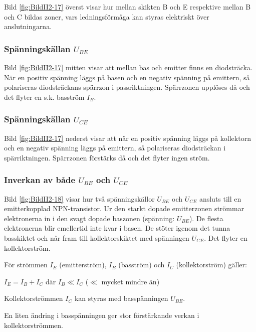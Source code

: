 Bild \ref{fig:BildII2-17} överst visar hur mellan skikten B och E respektive
mellan B och C bildas zoner, vars ledningsförmåga kan styras elektriskt över
anslutningarna.

\subsubsection{Spänningskällan \(U_{BE}\)}

Bild \ref{fig:BildII2-17} mitten visar att mellan bas och emitter finns en
diodsträcka.
När en positiv spänning läggs på basen och en negativ spänning på emittern,
så polariseras diodsträckans spärrzon i passriktningen.
Spärrzonen upplöses då och det flyter en s.k. basström \(I_B\).

\subsubsection{Spänningskällan \(U_{CE}\)}

Bild \ref{fig:BildII2-17} nederst visar att när en positiv spänning läggs
på kollektorn och en negativ spänning läggs på emittern, så polariseras
diodsträckan i spärriktningen.
Spärrzonen förstärks då och det flyter ingen ström.

\subsubsection{Inverkan av både \(U_{BE}\) och \(U_{CE}\)}

Bild \ref{fig:BildII2-18} visar hur två spänningskällor \(U_{BE}\) och
\(U_{CE}\) ansluts till en emitterkopplad NPN-transistor.
Ur den starkt dopade emitterzonen strömmar elektronerna in i den svagt dopade
baszonen (spänning: \(U_{BE}\)).
De flesta elektronerna blir emellertid inte kvar i basen.
De stöter igenom det tunna basskiktet och når fram till
kollektorskiktet med spänningen \(U_{CE}\). Det flyter en kollektorström.

För strömmen \(I_E\) (emitterström), \(I_B\) (basström) och \(I_C\)
(kollektorström) gäller:

\(I_E = I_B + I_C\) där \(I_B \ll I_C\) (\(\ll\) mycket mindre än)

Kollektorströmmen \(I_C\) kan styras med basspänningen \(U_{BE}\).

En liten ändring i basspänningen ger stor förstärkande verkan i
kollektorströmmen.

